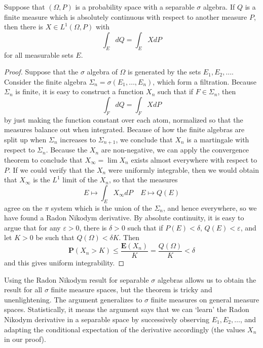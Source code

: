\begin{theorem}
    Suppose that $(\Omega,P)$ is a probability space with a separable $\sigma$ algebra. If $Q$ is a finite measure which is absolutely continuous with respect to another measure $P$, then there is $X \in L^1(\Omega,P)$ with
    \[ \int_E dQ = \int_E X dP \]
    for all measurable sets $E$.
\end{theorem}
\begin{proof}
    Suppose that the $\sigma$ algebra of $\Omega$ is generated by the sets $E_1, E_2, \dots$. Consider the finite algebra $\Sigma_n = \sigma(E_1, \dots, E_n)$, which form a filtration. Because $\Sigma_n$ is finite, it is easy to construct a function $X_n$ such that if $F \in \Sigma_n$, then
    \[ \int_F dQ = \int_F X dP \]
    by just making the function constant over each atom, normalized so that the measures balance out when integrated. Because of how the finite algebras are split up when $\Sigma_n$ increases to $\Sigma_{n+1}$, we conclude that $X_n$ is a martingale with respect to $\Sigma_n$. Because the $X_n$ are non-negative, we can apply the convergence theorem to conclude that $X_\infty = \lim X_n$ exists almost everywhere with respect to $P$. If we could verify that the $X_n$ were uniformly integrable, then we would obtain that $X_\infty$ is the $L^1$ limit of the $X_n$, so that the measures
    \[ E \mapsto \int_E X_\infty dP\ \ \ \ \ E \mapsto Q(E) \]
    agree on the $\pi$ system which is the union of the $\Sigma_n$, and hence everywhere, so we have found a Radon Nikodym derivative. By absolute continuity, it is easy to argue that for any $\varepsilon > 0$, there is $\delta > 0$ such that if $P(E) < \delta$, $Q(E) < \varepsilon$, and let $K > 0$ be such that $Q(\Omega) < \delta K$. Then
    \[ \mathbf{P}(X_n > K) \leq \frac{\mathbf{E}(X_n)}{K} = \frac{Q(\Omega)}{K} < \delta \]
    and this gives uniform integrability.
\end{proof}

Using the Radon Nikodym result for separable $\sigma$ algebras allows us to obtain the result for all $\sigma$ finite measure spaces, but the theorem is tricky and unenlightening. The argument generalizes to $\sigma$ finite measures on general measure spaces. Statistically, it means the argument says that we can `learn' the Radon Nikodym derivative in a separable space by successively observing $E_1, E_2, \dots$, and adapting the conditional expectation of the derivative accordingly (the values $X_n$ in our proof).


